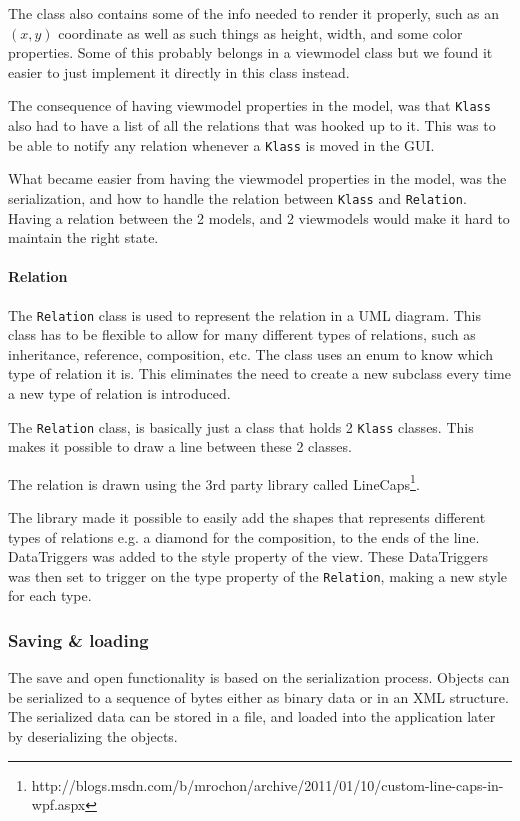 The class also contains some of the info needed to render it properly, such as
an $(x, y)$ coordinate as well as such things as height, width, and some color
properties. Some of this probably belongs in a viewmodel class but we found it
easier to just implement it directly in this class instead.

The consequence of having viewmodel properties in the model, was that
\texttt{Klass} also had to have a list of all the relations that was hooked up
to it. This was to be able to notify any relation whenever a \texttt{Klass} is
moved in the GUI. 

What became easier from having the viewmodel properties in the model, was the
serialization, and how to handle the relation between \texttt{Klass} and
\texttt{Relation}. Having a relation between the 2 models, and 2 viewmodels
would make it hard to maintain the right state.

\paragraph{Relation}
The \texttt{Relation} class is used to represent the relation in a UML diagram.
This class has to be flexible to allow for many different types of relations,
such as inheritance, reference, composition, etc. The class uses an enum to
know
which type of relation it is. This eliminates the need to create a new subclass
every time a new type of relation is introduced.

The \texttt{Relation} class, is basically just a class that holds 2
\texttt{Klass} classes. This makes it possible to draw a line between these 2
classes.

The relation is drawn using the 3rd party library called
LineCaps\footnote{http://blogs.msdn.com/b/mrochon/archive/2011/01/10/custom-line-caps-in-wpf.aspx}.

The library made it possible to easily add the shapes that represents different
types of relations e.g. a diamond for the composition, to the ends of the line.
DataTriggers was added to the style property of the view. These DataTriggers was
then set to trigger on the type property of the \texttt{Relation}, making a new
style for each type.

\subsubsection{Saving \& loading}
The save and open functionality is based on the serialization process. Objects
can be serialized to a sequence of bytes either as binary data or in an XML
structure. The serialized data can be stored in a file, and loaded into the
application later by deserializing the objects.

